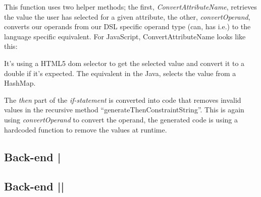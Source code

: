 \documentclass[paper=a4, fontsize=11pt]{scrartcl} %
\numberwithin{equation}{section} %
\numberwithin{figure}{section} %
\numberwithin{table}{section} %
\begin{document}


This function uses two helper methods; the first, \textit{ConvertAttributeName}, retrieves the value the user has selected for a given attribute, the other, \textit{convertOperand}, converts our operands from our DSL specific operand type (can, has i.e.) to the language specific equivalent.
For JavaScript, ConvertAttributeName looks like this:



It’s using a HTML5 dom selector to get the selected value and convert it to a double if it’s expected.
The equivalent in the Java, selects the value from a HashMap.



The \textit{then} part of the \textit{if-statement} is converted into code that removes invalid values in the recursive method “generateThenConstraintString”. This is again using \textit{convertOperand} to convert the operand, the generated code is using a hardcoded function to remove the values at runtime.



\subsection{Back-end |}
\subsection{Back-end ||}

\end{document}
